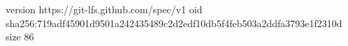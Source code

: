 version https://git-lfs.github.com/spec/v1
oid sha256:719adf45901d9501a242435489c2d2edf10db5f4feb503a2ddfa3793e1f2310d
size 86
